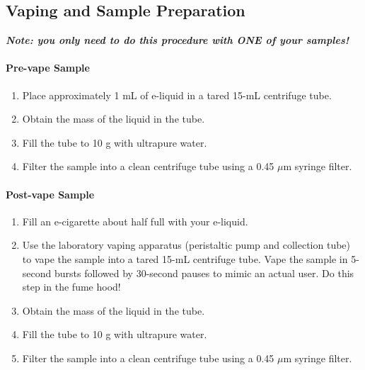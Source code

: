\documentclass[]{tufte-book}
\providecommand{\tightlist}{%
  \setlength{\itemsep}{0pt}\setlength{\parskip}{0pt}}
\begin{document}
\hypertarget{vaping-and-sample-preparation}{%
\subsection{Vaping and Sample Preparation}\label{vaping-and-sample-preparation}}

\textbf{\emph{Note: you only need to do this procedure with ONE of your samples!}}

\hypertarget{pre-vape-sample}{%
\paragraph{\texorpdfstring{\textbf{Pre-vape Sample}}{Pre-vape Sample}}\label{pre-vape-sample}}

\begin{enumerate}
\def\labelenumi{\arabic{enumi}.}
\tightlist
\item
  Place approximately 1 mL of e-liquid in a tared 15-mL centrifuge tube.
\item
  Obtain the mass of the liquid in the tube.
\item
  Fill the tube to 10 g with ultrapure water.
\item
  Filter the sample into a clean centrifuge tube using a 0.45 \(\mu\)m syringe filter.
\end{enumerate}

\hypertarget{post-vape-sample}{%
\paragraph{\texorpdfstring{\textbf{Post-vape Sample}}{Post-vape Sample}}\label{post-vape-sample}}

\begin{enumerate}
\def\labelenumi{\arabic{enumi}.}
\tightlist
\item
  Fill an e-cigarette about half full with your e-liquid.
\item
  Use the laboratory vaping apparatus (peristaltic pump and collection tube) to vape the sample into a tared 15-mL centrifuge tube. Vape the sample in 5-second bursts followed by 30-second pauses to mimic an actual user. Do this step in the fume hood!
\item
  Obtain the mass of the liquid in the tube.
\item
  Fill the tube to 10 g with ultrapure water.
\item
  Filter the sample into a clean centrifuge tube using a 0.45 \(\mu\)m syringe filter.
\end{enumerate}
\end{document}
